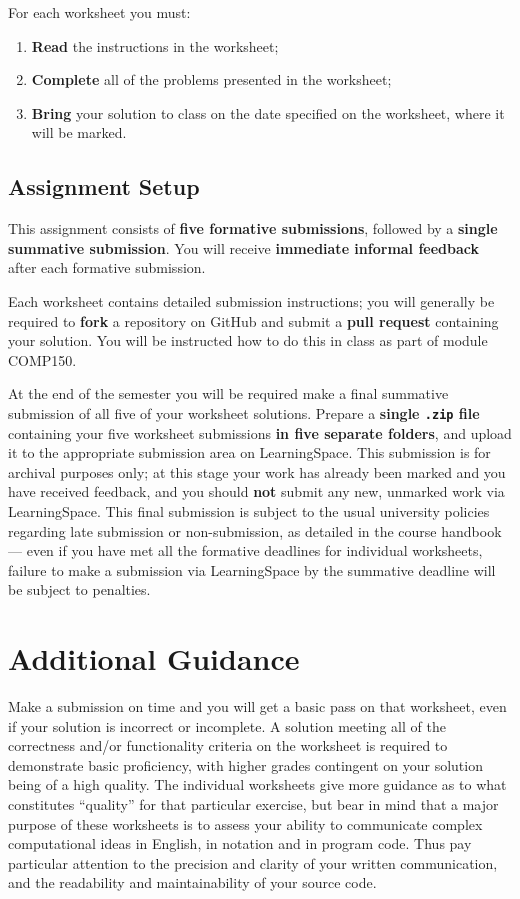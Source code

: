 \documentclass{../../fal_assignment}
\begin{document}
For each worksheet you must:
\begin{enumerate}[label=(\roman*)]
    \item \textbf{Read} the instructions in the worksheet;
    \item \textbf{Complete} all of the problems presented in the worksheet;
    \item \textbf{Bring} your solution to class on the date specified on the worksheet,
    	where it will be marked.
\end{enumerate}

\subsection*{Assignment Setup}

This assignment consists of \textbf{five formative submissions}, followed by a \textbf{single summative submission}.
You will receive \textbf{immediate informal feedback} after each formative submission.

Each worksheet contains detailed submission instructions; you will generally be required to \textbf{fork} a repository on GitHub and submit a \textbf{pull request} containing your solution. You will be instructed how to do this in class as part of module COMP150.

At the end of the semester you will be required make a final summative submission of all five of your worksheet solutions.
Prepare a \textbf{single \texttt{.zip} file} containing your five worksheet submissions \textbf{in five separate folders}, and upload it to the appropriate submission area on LearningSpace.
This submission is for archival purposes only; at this stage your work has already been marked and you have received feedback, and you should \textbf{not} submit any new, unmarked work via LearningSpace.
This final submission is subject to the usual university policies regarding late submission or non-submission,
as detailed in the course handbook ---
even if you have met all the formative deadlines for individual worksheets,
failure to make a submission via LearningSpace by the summative deadline will be subject to penalties.

\section*{Additional Guidance}

Make a submission on time and you will get a basic pass on that worksheet,
even if your solution is incorrect or incomplete.
A solution meeting all of the correctness and/or functionality criteria on the worksheet is required to demonstrate basic proficiency,
with higher grades contingent on your solution being of a high quality.
The individual worksheets give more guidance as to what constitutes ``quality'' for that particular exercise,
but bear in mind that a major purpose of these worksheets is to assess your ability to communicate
complex computational ideas in English, in notation and in program code.
Thus pay particular attention to the precision and clarity of your written communication,
and the readability and maintainability of your source code.
\end{document}
